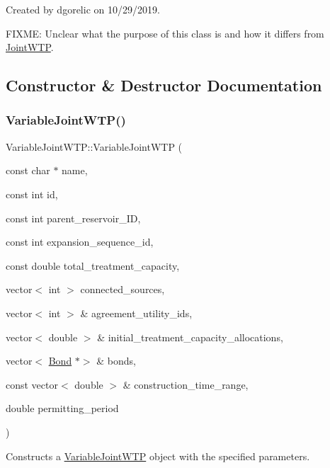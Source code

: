 Created by dgorelic on 10/29/2019.

F\+I\+X\+ME\+: Unclear what the purpose of this class is and how it differs from \mbox{\hyperlink{classJointWTP}{Joint\+W\+TP}}. 

\subsection{Constructor \& Destructor Documentation}
\mbox{\label{classVariableJointWTP_a26fa2204e90fb7e44f17dbd2958a56fc}} 
\subsubsection{\texorpdfstring{Variable\+Joint\+W\+T\+P()}{VariableJointWTP()}\hspace{0.1cm}{\footnotesize\ttfamily [1/2]}}
{\footnotesize\ttfamily Variable\+Joint\+W\+T\+P\+::\+Variable\+Joint\+W\+TP (\begin{DoxyParamCaption}\item[{const char $\ast$}]{name,  }\item[{const int}]{id,  }\item[{const int}]{parent\+\_\+reservoir\+\_\+\+ID,  }\item[{const int}]{expansion\+\_\+sequence\+\_\+id,  }\item[{const double}]{total\+\_\+treatment\+\_\+capacity,  }\item[{vector$<$ int $>$}]{connected\+\_\+sources,  }\item[{vector$<$ int $>$ \&}]{agreement\+\_\+utility\+\_\+ids,  }\item[{vector$<$ double $>$ \&}]{initial\+\_\+treatment\+\_\+capacity\+\_\+allocations,  }\item[{vector$<$ \mbox{\hyperlink{classBond}{Bond}} $\ast$$>$ \&}]{bonds,  }\item[{const vector$<$ double $>$ \&}]{construction\+\_\+time\+\_\+range,  }\item[{double}]{permitting\+\_\+period }\end{DoxyParamCaption})}



Constructs a {\ttfamily \mbox{\hyperlink{classVariableJointWTP}{Variable\+Joint\+W\+TP}}} object with the specified parameters. 

